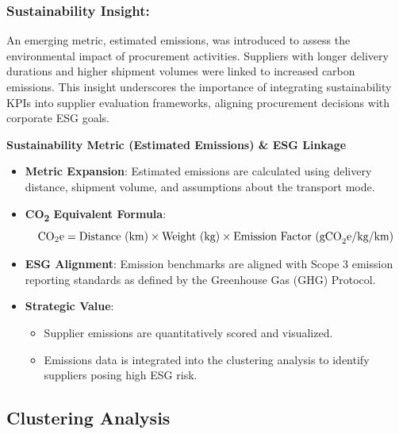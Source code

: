 \documentclass[10pt, twocolumn]{article}
\begin{document}
\subsubsection{Sustainability Insight:} An emerging metric, estimated emissions, was introduced to assess the environmental impact of procurement activities. Suppliers with longer delivery durations and higher shipment volumes were linked to increased carbon emissions. This insight underscores the importance of integrating sustainability KPIs into supplier evaluation frameworks, aligning procurement decisions with corporate ESG goals.

\textbf*{Sustainability Metric (Estimated Emissions) \& ESG Linkage}
\begin{itemize}
    \item \textbf{Metric Expansion}: Estimated emissions are calculated using delivery distance, shipment volume, and assumptions about the transport mode.

    \item \textbf{CO\textsubscript{2} Equivalent Formula}:
    \[
    \resizebox{0.95\columnwidth}{!}{
    $\text{CO}_{2}\text{e} = \text{Distance (km)} \times \text{Weight (kg)} \times \text{Emission Factor (gCO}_{2}\text{e/kg/km)}$
    }
    \]


    \item \textbf{ESG Alignment}: Emission benchmarks are aligned with Scope 3 emission reporting standards as defined by the Greenhouse Gas (GHG) Protocol.

    \item \textbf{Strategic Value}:
    \begin{itemize}
        \item Supplier emissions are quantitatively scored and visualized.
        \item Emissions data is integrated into the clustering analysis to identify suppliers posing high ESG risk.
    \end{itemize}
\end{itemize}


\subsection{Clustering Analysis}
\end{document}
